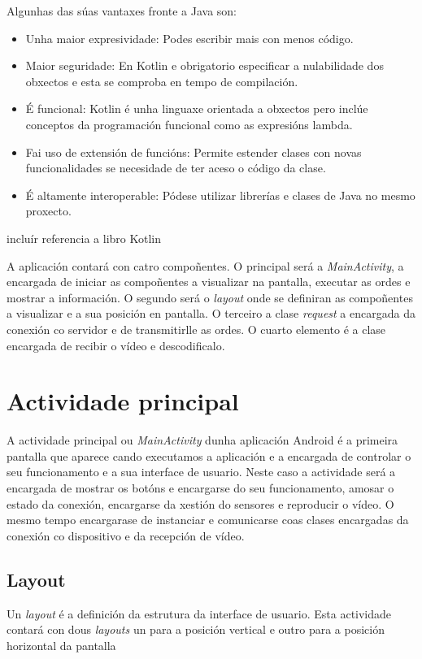 Algunhas das súas vantaxes fronte a Java son:
\begin{itemize}
    \item Unha maior expresividade: Podes escribir mais con menos código.
    \item Maior seguridade: En Kotlin e obrigatorio especificar a nulabilidade dos obxectos e esta se comproba en tempo de compilación.
    \item É funcional: Kotlin é unha linguaxe orientada a obxectos pero inclúe conceptos da programación funcional como as expresións lambda.
    \item Fai uso de extensión de funcións: Permite estender clases con novas funcionalidades se necesidade de ter aceso o código da clase.
    \item É altamente interoperable: Pódese utilizar librerías e clases de Java no mesmo proxecto.
\end{itemize}
incluír referencia a libro Kotlin

A aplicación contará con catro compoñentes. O principal será a \emph{MainActivity}, a encargada de iniciar as compoñentes a visualizar na pantalla, executar as ordes e mostrar a información. O segundo será o \emph{layout} onde se definiran as compoñentes a visualizar e a sua posición en pantalla. O terceiro a clase \emph{request} a encargada da conexión co servidor e de transmitirlle as ordes. O cuarto elemento é a clase encargada de recibir o vídeo e descodificalo.

\section{Actividade principal}
A actividade principal ou \emph{MainActivity} dunha aplicación Android é a primeira pantalla que aparece cando executamos a aplicación e a encargada de controlar o seu funcionamento e a sua interface de usuario. Neste caso a actividade será a encargada de mostrar os botóns e encargarse do seu funcionamento, amosar o estado da conexión, encargarse da xestión do sensores e reproducir o vídeo. O mesmo tempo encargarase de instanciar e comunicarse coas clases encargadas da conexión co dispositivo e da recepción de vídeo.

\subsection{Layout}
Un \emph{layout} é a definición da estrutura da interface de usuario. Esta actividade contará con dous \emph{layouts} un para a posición vertical e outro para a posición horizontal da pantalla
